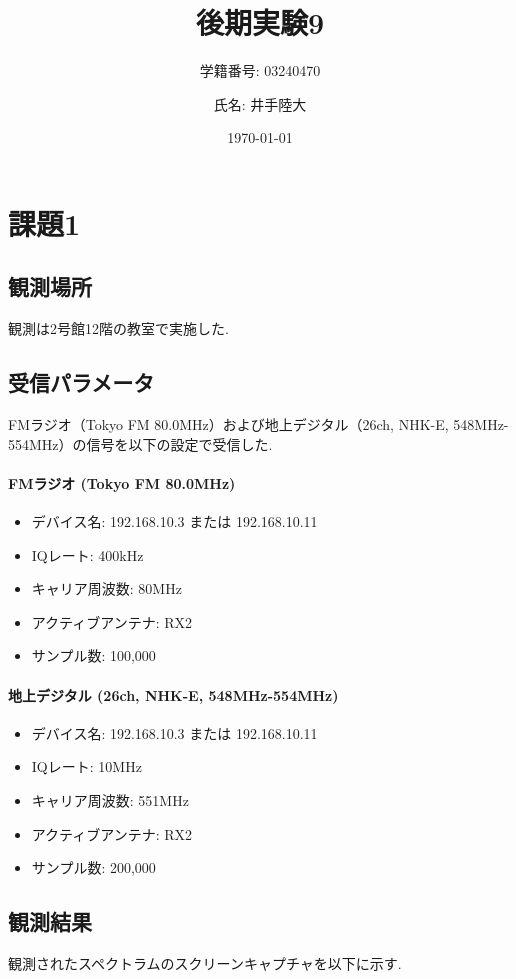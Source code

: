 \documentclass[a4paper, twocolumn]{article} %
\title{後期実験9}
\author{学籍番号: 03240470 \and 氏名: 井手陸大}
\date{\today}
\begin{document}
\maketitle

\section{課題1}
\subsection{観測場所}
観測は2号館12階の教室で実施した.

\subsection{受信パラメータ}
FMラジオ（Tokyo FM 80.0MHz）および地上デジタル（26ch, NHK-E, 548MHz-554MHz）の信号を以下の設定で受信した.

\paragraph{FMラジオ (Tokyo FM 80.0MHz)}
\begin{itemize}
    \item デバイス名: 192.168.10.3 または 192.168.10.11
    \item IQレート: 400kHz
    \item キャリア周波数: 80MHz
    \item アクティブアンテナ: RX2
    \item サンプル数: 100,000
\end{itemize}

\paragraph{地上デジタル (26ch, NHK-E, 548MHz-554MHz)}
\begin{itemize}
    \item デバイス名: 192.168.10.3 または 192.168.10.11
    \item IQレート: 10MHz
    \item キャリア周波数: 551MHz
    \item アクティブアンテナ: RX2
    \item サンプル数: 200,000
\end{itemize}

\subsection{観測結果}
観測されたスペクトラムのスクリーンキャプチャを以下に示す.
\end{document}
